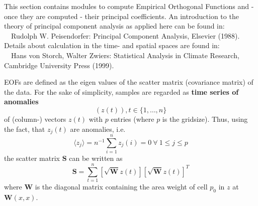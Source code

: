 This section contains modules to compute Empirical Orthogonal Functions and 
- once they are computed - their principal coefficients. An introduction to the theory 
of principal component analysis as applied here can be found in:\\ 
~~Rudolph W. Peisendorfer: Principal Component Analysis, Elsevier (1988).\\
Details about calculation in the time- and spatial spaces are found in:\\
~~Hans von Storch, Walter Zwiers: Statistical Analysis in Climate Research, 
   Cambridge University Press (1999).

EOFs are defined as the eigen values of the scatter matrix (covariance matrix) of
the data. For the sake of simplicity, samples are regarded as {\bf time series of anomalies}
\begin{equation}
\left(z(t)\right), t\in\{1,\ldots,n\}
\end{equation}
of (column-) vectors \(z(t)\) with \(p\) entries (where \(p\) is the gridsize). 
Thus, using the fact, that \(z_j(t)\) are anomalies, i.e.
\begin{equation}
\langle z_j\rangle=n^{-1}\sum_{i=1}^{n}z_j(i)=0~\forall~1\le j \le p
\end{equation} the scatter matrix \(\mathbf{S}\) can be written as
\begin{equation}
\mathbf{S} = \sum_{t=1}^{n} \left[\sqrt{\mathbf{W}}z(t)\right]\left[\sqrt{\mathbf{W}}z(t)\right]^T
\end{equation}
where \(\mathbf{W}\) is the diagonal matrix containing the area weight of cell \(p_0\) 
in \(z\) at \(\mathbf{W}(x,x)\).

